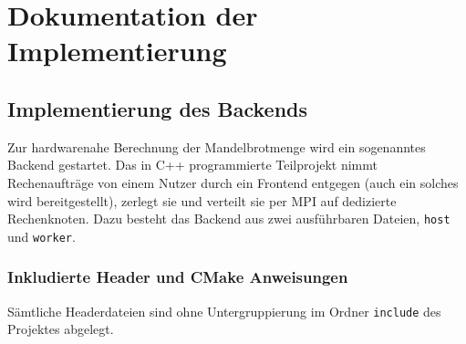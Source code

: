 



\section{Dokumentation der Implementierung}

\subsection{Implementierung des Backends}

Zur hardwarenahe Berechnung der Mandelbrotmenge wird ein sogenanntes Backend gestartet.
Das in C++ programmierte Teilprojekt nimmt Rechenaufträge von einem Nutzer durch ein Frontend entgegen (auch
ein solches wird bereitgestellt), zerlegt sie und verteilt sie per MPI auf dedizierte Rechenknoten.
Dazu besteht das Backend aus zwei ausführbaren Dateien, \verb|host| und \verb|worker|.

\subsubsection{Inkludierte Header und CMake Anweisungen}

Sämtliche Headerdateien sind ohne Untergruppierung im Ordner \verb|include| des Projektes abgelegt.

